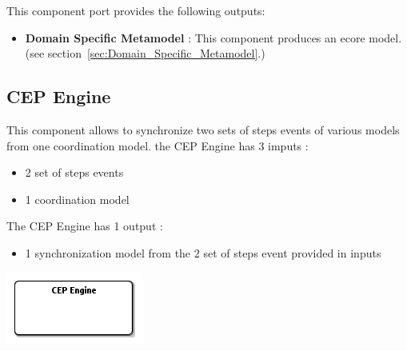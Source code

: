 \documentclass{gemoc} %
\begin{document}
This component port provides the following outputs:
\begin{itemize}
  \item \textbf{Domain Specific Metamodel} :
This component produces an ecore model.
(see section~\ref{sec:Domain_Specific_Metamodel}.)
\end{itemize}



\subsection{CEP Engine}
\label{sec:CEP_Engine}
This component allows to synchronize two sets of steps events of various models from one coordination model.
\newline the CEP Engine has 3 imputs :
\begin{itemize}
\item 2 set of steps events
\item 1 coordination model
\end{itemize}
The CEP Engine has 1 output :
\begin{itemize}
\item 1 synchronization model from the 2 set of steps event provided in inputs
\end{itemize}

\begin{center}
\includegraphics*[trim=0.0cm 0.0cm 0cm 0.0cm, clip=true]{../images/generated/Generated_CEP_Engine.png}
\end{center}
\end{document}
